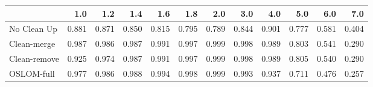 \begin{tabular}{lrrrrrrrrrrr}
\toprule
{} &   1.0 &   1.2 &   1.4 &   1.6 &   1.8 &   2.0 &   3.0 &   4.0 &   5.0 &   6.0 &   7.0 \\
\midrule
No Clean Up  & 0.881 & 0.871 & 0.850 & 0.815 & 0.795 & 0.789 & 0.844 & 0.901 & 0.777 & 0.581 & 0.404 \\
Clean-merge  & 0.987 & 0.986 & 0.987 & 0.991 & 0.997 & 0.999 & 0.998 & 0.989 & 0.803 & 0.541 & 0.290 \\
Clean-remove & 0.925 & 0.974 & 0.987 & 0.991 & 0.997 & 0.999 & 0.998 & 0.989 & 0.805 & 0.540 & 0.290 \\
OSLOM-full   & 0.977 & 0.986 & 0.988 & 0.994 & 0.998 & 0.999 & 0.993 & 0.937 & 0.711 & 0.476 & 0.257 \\
\bottomrule
\end{tabular}
